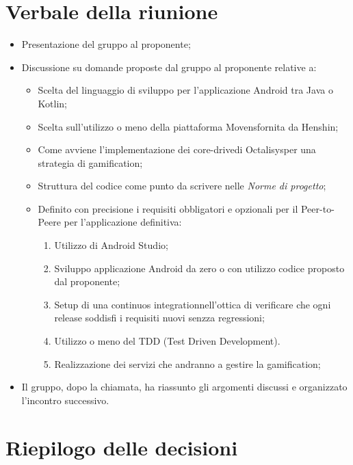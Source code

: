 \section{Verbale della riunione}
\begin{itemize}
	\item Presentazione del gruppo al proponente;
	\item Discussione su domande proposte dal gruppo al proponente relative a:
		\begin{itemize}
			\item Scelta del linguaggio di sviluppo per l'applicazione Android tra Java o Kotlin\glo;
			\item Scelta sull'utilizzo o meno della piattaforma Movens\glosp fornita da Henshin\glo;
			\item Come avviene l'implementazione dei core-drive\glosp di Octalisys\glosp per una strategia di gamification\glo;
			\item Struttura del codice come punto da scrivere nelle \textit{Norme di progetto};
			\item Definito con precisione i requisiti obbligatori e opzionali per il Peer-to-Peer\glosp e per l'applicazione definitiva:
				\begin{enumerate}
					\item Utilizzo di Android Studio;
					\item Sviluppo applicazione Android da zero o con utilizzo codice proposto dal proponente;
					\item Setup di una continuos integration\glosp nell'ottica di verificare che ogni release soddisfi i requisiti nuovi senzza regressioni;
					\item Utilizzo o meno del TDD (Test Driven Development).
					\item Realizzazione dei servizi che andranno a gestire la gamification; 
				\end{enumerate}
		\end{itemize}
	\item Il gruppo, dopo la chiamata, ha riassunto gli argomenti discussi e organizzato l'incontro successivo.
\end{itemize} 
\pagebreak
\section{Riepilogo delle decisioni}

	
